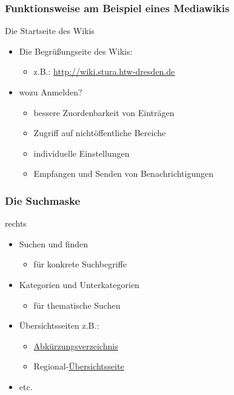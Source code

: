 \documentclass{beamer}
\begin{document}
\begin{frame}
  \frametitle{Funktionsweise am Beispiel eines Mediawikis}{Die Startseite des Wikis}

  \begin{itemize}
    \item Die Begrüßungseite des Wikis:
    \begin{itemize}
      \item z.B.: \url{http://wiki.stura.htw-dresden.de}
    \end{itemize}
    \item wozu Anmelden?
    \begin{itemize}
      \item bessere Zuordenbarkeit von Einträgen
      \item Zugriff auf nichtöffentliche Bereiche
      \item individuelle Einstellungen
      \item Empfangen und Senden von Benachrichtigungen
    \end{itemize}
  \end{itemize}
\end{frame}

\begin{frame}
  \frametitle{Die Suchmaske}

  rechts

  \begin{itemize}
    \item Suchen und finden
    \begin{itemize}
      \item für konkrete Suchbegriffe
    \end{itemize}
    \item Kategorien und Unterkategorien
    \begin{itemize}
      \item für thematische Suchen
    \end{itemize}
    \item Übersichtsseiten z.B.:
    \begin{itemize}
      \item \href{http://wiki.stura.htw-dresden.de/index.php/Kategorie:Abk\%C3\%BCrzung}{Abkürzungsverzeichnis}
      \item Regional-\href{http://food.the-empire.de/index.php/Hauptseite}{Übersichtsseite}
    \end{itemize}
    \item etc.
  \end{itemize}
\end{frame}
\end{document}

